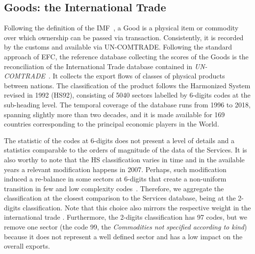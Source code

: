 \documentclass[fleqn,10pt]{article}
\begin{document}
\subsection*{Goods: the International Trade}
Following the definition of the IMF~\cite{BOPS}, a Good is a physical item or commodity over which ownership can be passed via transaction. 
Consistently, it is recorded by the customs and available via UN-COMTRADE.
Following the standard approach of EFC, the reference database collecting the scores of the Goods is the reconciliation of the International Trade database contained in \textit{UN-COMTRADE}~\cite{COMTRADE}.
It collects the export flows of classes of physical products between nations.
The classification of the product follows the Harmonized System revised in 1992 (HS92), consisting of 5040 sectors labelled by 6-digits codes at the sub-heading level.
The temporal coverage of the database runs from 1996 to 2018, spanning slightly more than two decades, and it is made available for 169 countries corresponding to the principal economic players in the World.


The statistic of the codes at 6-digits does not present a level of details and a statistics comparable to the orders of magnitude of the data of the Services.
It is also worthy to note that the HS classification varies in time and in the available years a relevant modification happens in 2007.
Perhaps, such modification induced a re-balance in some sectors at 6-digits that create a non-uniform transition in few and low complexity codes~\cite{JRC_report}.
Therefore, we aggregate the classification at the closest comparison to the Services database, being at the 2-digits classification. Note that this choice also mirrors the respective weight in the international trade \cite{loungani2017world}.
Furthermore, the 2-digits classification has 97 codes, but we remove one sector (the code 99, the \emph{Commodities not specified according to kind}) because it does not represent a well defined sector and has a low impact on the overall exports.


\end{document}
